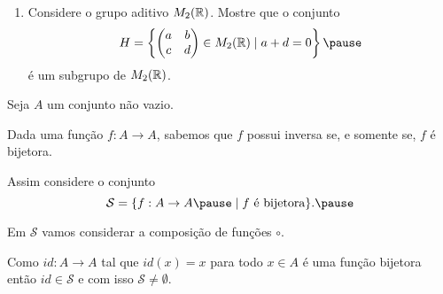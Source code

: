 \documentclass{beamer}
\begin{document}
    \begin{frame}
        \begin{exemplos}
            \begin{enumerate}[label={\roman*})]
                \conti
                \item Considere o grupo aditivo $M_2(\mathbb{R})$. \pause Mostre que o conjunto\pause
                \[
                    H = \left\{\begin{pmatrix}
                        a & b\\c & d
                    \end{pmatrix} \in M_2(\real) \mid a + d = 0\right\} \pause
                \]
                é um subgrupo de $M_2(\mathbb{R})$.
            \end{enumerate}
        \end{exemplos}
    \end{frame}

     \begin{frame}
        Seja $A$ um conjunto não vazio.\pause

        \vspace{.3cm}

        Dada uma função $f : A \to A$, sabemos que $f$ possui inversa \pause se, e somente se, $f$ é bijetora.\pause

        \vspace{.3cm}

        Assim considere o conjunto\pause
        \[
            \mathcal{S} = \{ f : A \to A \pause \mid f \mbox{ é bijetora}\}.\pause
        \]

        Em $\mathcal{S}$ vamos considerar a composição de funções $\circ$.\pause

        \vspace{.3cm}

        Como $id : A \to A$ tal que $id(x) = x$ para todo $x \in A$ \pause é uma função bijetora \pause então $id \in \mathcal{S}$ \pause e com isso $\mathcal{S} \ne \emptyset$.
    \end{frame}
\end{document}
